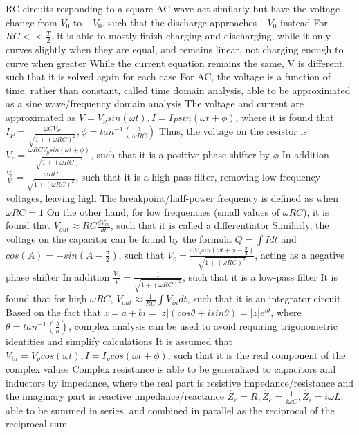 \documentclass[11 pt, twoside]{article}
\newenvironment{outline*}
{
	\begin{outline}[enumerate]
	}
	{\end{outline}
}
\begin{document}
\begin{outline*}
	\2 RC circuits responding to a square AC wave act similarly but have the voltage change from $V_0$ to $-V_0$, such that the discharge approaches $-V_0$ instead
		\3 For $RC << \frac{T}{2}$, it is able to mostly finish charging and discharging, while it only curves slightly when they are equal, and remains linear, not charging enough to curve when greater
		\3 While the current equation remains the same, V is different, such that it is solved again for each case
	\2 For AC, the voltage is a function of time, rather than constant, called time domain analysis, able to be approximated as a sine wave/frequency domain analysis
		\3 The voltage and current are approximated as $V = V_p sin(\omega t), I = I_P sin(\omega t + \phi)$, where it is found that $I_P = \frac{\omega CV_P}{\sqrt{1 + (\omega RC)^2}}, \phi = tan^{-1}(\frac{1}{\omega RC})$
		\3 Thus, the voltage on the resistor is $V_r = \frac{\omega RCV_psin(\omega t + \phi)}{\sqrt{1 + (\omega RC)^2}}$, such that it is a positive phase shifter by $\phi$
			\4 In addition $\frac{V_r}{V} = \frac{\omega RC}{\sqrt{1 + (\omega RC)^2}}$, such that it is a high-pass filter, removing low frequency voltages, leaving high
			\4 The breakpoint/half-power frequency is defined as when $\omega RC = 1$
			\4 On the other hand, for low frequencies (small values of $\omega RC$), it is found that $V_{out} \approx RC\frac{dV_{in}}{dt}$, such that it is called a differentiator
		\3 Similarly, the voltage on the capacitor can be found by the formula $Q = \int Idt$ and $cos(A) = -sin(A - \frac{\pi}{2})$, such that $V_c = \frac{\omega V_psin(\omega t + \phi - \frac{\pi}{2})}{\sqrt{1 + (\omega RC)^2}}$, acting as a negative phase shifter
			\4 In addition $\frac{V_c}{V} = \frac{1}{\sqrt{1 + (\omega RC)^2}}$, such that it is a low-pass filter
			\4 It is found that for high $\omega RC$, $V_{out} \approx \frac{1}{RC}\int V_{in}dt$, such that it is an integrator circuit
\1 Based on the fact that $z = a + bi = |z|(cos\theta + isin\theta) = |z|e^{i\theta}$, where $\theta = tan^{-1} (\frac{b}{a})$, complex analysis can be used to avoid requiring trigonometric identities and simplify calculations
	\2 It is assumed that $V_{in} = V_pcos(\omega t), I = I_p cos(\omega t + \phi)$, such that it is the real component of the complex values
	\2 Complex resistance is able to be generalized to capacitors and inductors by impedance, where the real part is resistive impedance/resistance and the imaginary part is reactive impedance/reactance
		\3 $\hat{Z}_r = R, \hat{Z}_c = \frac{1}{i\omega C}, \hat{Z}_i = i\omega L$, able to be summed in series, and combined in parallel as the reciprocal of the reciprocal sum

\end{outline*}
\end{document}
